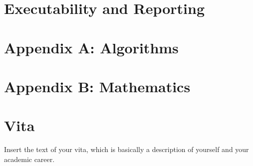 \documentclass[12pt,letterpaper]{lsuetd}
\begin{document}
\chapter{Executability and Reporting}
\doublespacing

\pagebreak
\singlespacing

%
\doublespacing



\pagebreak
\singlespacing
{}
\appendix
\chapter{Appendix A: Algorithms}
\vspace{0.5em}

\pagebreak
\chapter{Appendix B: Mathematics}
\vspace{0.5em}

\pagebreak

\chapter*{Vita}
\doublespacing
\setlength{\parindent}{1.75em}
\vspace{0.2em}
Insert the text of your vita, which is basically a description of yourself and your academic career.
\end{document}

